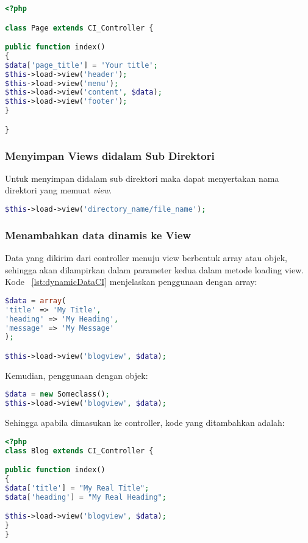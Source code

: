 \begin{lstlisting}[frame=single, language=PHP, label={lst:loadSomeViewCI}, caption=Contoh load beberapa view pada CodeIgniter.] 
<?php

class Page extends CI_Controller {

public function index()
{
$data['page_title'] = 'Your title';
$this->load->view('header');
$this->load->view('menu');
$this->load->view('content', $data);
$this->load->view('footer');
}

}
\end{lstlisting}

\subsubsection{Menyimpan Views didalam Sub Direktori}

Untuk menyimpan didalam sub direktori maka dapat menyertakan nama direktori yang memuat \textit{view}.
\begin{lstlisting}[frame=single, language=PHP, label={lst:loadSubDirektoriCI}, caption=Struktur penyimpanan views dalam sub direktori.] 
$this->load->view('directory_name/file_name');
\end{lstlisting}

\subsubsection{Menambahkan data dinamis ke View}

Data yang dikirim dari controller menuju view berbentuk array atau objek, sehingga akan dilampirkan dalam parameter kedua dalam metode loading view.
Kode ~\ref{lst:dynamicDataCI} menjelaskan penggunaan dengan array:
\begin{lstlisting}[frame=single, language=PHP, label={lst:dynamicDataCI}, caption=Struktur data dinamis.] 
$data = array(
'title' => 'My Title',
'heading' => 'My Heading',
'message' => 'My Message'
);

$this->load->view('blogview', $data);
\end{lstlisting}

\noindent Kemudian, penggunaan dengan objek:
\begin{lstlisting}[frame=single, language=PHP, label={lst:dynamicObjectDataCI}, caption=Struktur data dinamis berbentuk objek.] 
$data = new Someclass();
$this->load->view('blogview', $data);
\end{lstlisting}

\noindent Sehingga apabila dimasukan ke controller, kode yang ditambahkan adalah:
\begin{lstlisting}[frame=single, language=PHP, label={lst:dynamicControllerDataCI}, caption=Struktur data dinamis dalam controller.] 
<?php
class Blog extends CI_Controller {

public function index()
{
$data['title'] = "My Real Title";
$data['heading'] = "My Real Heading";

$this->load->view('blogview', $data);
}
}
\end{lstlisting}

